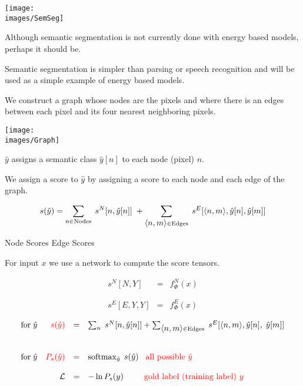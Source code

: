 {

\centerline{\texttt{[image: \\images/SemSeg]}}

\vfill
Although semantic segmentation is not currently done with energy based models, perhaps it should be.

\vfill
Semantic segmentation is simpler than parsing or speech recognition and will be used as a simple example of energy based models.


We construct a graph whose nodes are the pixels and where there is an edges between each pixel and its four nearest neighboring pixels.

\vfill

\centerline{\texttt{[image: \\images/Graph]}}     
\medskip

$\hat{y} $ assigns a semantic class $\hat{y}[n]$ to each node (pixel) $n$.

\vfill
We assign a score to $\hat{y}$ by assigning a score to each node and each edge of the graph.

{\color{red} $$s(\hat{y}) = \sum_{n \in \mathrm{Nodes}}\; s^N[n,\hat{y}[n]]\; + \sum_{{\mbox{$\langle n,m\rangle$}} \in \mathrm{Edges}}\;s^E[{\mbox{$\langle n,m\rangle$}},\hat{y}[n],\hat{y}[m]]$$}
\centerline{Node Scores \hspace{6em}Edge Scores \hspace{3em}~}


For input $x$ we use a network to compute the score tensors.

\vfill
\begin{eqnarray*}
s^N[N,Y] & = & f^N_\Phi(x) \\
\\
\\
s^E[E,Y,Y] & = & f^E_\Phi(x)
\end{eqnarray*}


{\huge
$$\begin{array}{lrcl}
\mbox{for}\;\hat{y} & {\color{red} s(\hat{y})} & = & \sum_n\;s^N[n,\hat{y}[n]] + \sum_{{\mbox{$\langle n,m\rangle$}} \in \mathrm{Edges}}\;s^E[{\mbox{$\langle n,m\rangle$}},\hat{y}[n],\;\hat{y}[m]] \\
\\
\\
\mbox{for}\;\hat{y} & {\color{red} P_s(\hat{y})} & = & \operatorname*{softmax}_{\hat{y}}\;s(\hat{y}) \;\;\;\mbox{\color{red} all possible $\hat{y}$} \\
\\
 & {\cal L} & = & - \ln P_s(y) \;\;\;{\color{red} \;\;\;\;\;\;\mbox{gold label (training label) $y$}}
\end{array}$$
}

}
